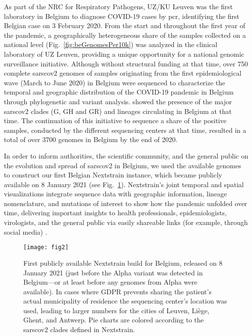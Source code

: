 As part of the NRC for Respiratory Pathogens, UZ/KU Leuven was the first laboratory in Belgium to diagnose COVID-19 cases by \gls{pcr}, identifying the first Belgian case on 3 February 2020.
From the start and throughout the first year of the pandemic, a geographically heterogeneous share of the samples collected on a national level (Fig.~\ref{fig:beGenomesPer10k}) was analyzed in the clinical laboratory of UZ Leuven, providing a unique opportunity for a national genomic surveillance initiative.
Although without structural funding at that time, over 750 complete \gls{sarscov2} genomes of samples originating from the first epidemiological wave (March to June 2020) in Belgium were sequenced to characterize the temporal and geographic distribution of the COVID-19 pandemic in Belgium through phylogenetic and variant analysis.
\citet{wawina-bokalanga2021genetic} showed the presence of the major \gls{sarscov2} clades (G, GH and GR) and lineages circulating in Belgium at that time.
The continuation of this initiative to sequence a share of the positive samples, conducted by the different sequencing centers at that time, resulted in a total of over 3700 genomes in Belgium by the end of 2020.

In order to inform authorities, the scientific community, and the general public on the evolution and spread of \gls{sarscov2} in Belgium, we used the available genomes to construct our first Belgian Nextstrain instance, which became publicly available on 8 January 2021 (see Fig.~\ref{fig:beFirstMap}).
Nextstrain's joint temporal and spatial visualizations integrate sequence data with geographic information, lineage nomenclature, and mutations of interest to show how the pandemic unfolded over time, delivering important insights to health professionals, epidemiologists, virologists, and the general public via easily shareable links (for example, through social media) \citep{hadfield2018nextstrain}.

\begin{figure}[ht]
  \centering
  \texttt{[image: fig2]}
  \caption[First Belgian Nextstrain map]{First publicly available Nextstrain build for Belgium, released on 8 January 2021 (just before the Alpha variant was detected in Belgium—or at least before any genomes from Alpha were available). In cases where GDPR prevents sharing the patient's actual municipality of residence the sequencing center's location was used, leading to larger numbers for the cities of Leuven, Li\`{e}ge, Ghent, and Antwerp. Pie charts are colored according to the \gls{sarscov2} clades defined in Nextstrain.}
  \label{fig:beFirstMap}
\end{figure} 

